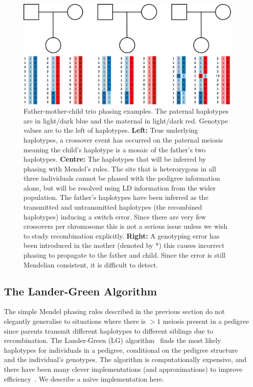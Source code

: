 \begin{figure}[h]
\vspace{20pt}
  \begin{center} 
    \includegraphics[width=\textwidth]{chap3figs/trio}
    \caption[Father-mother-child trio phasing examples]{Father-mother-child trio phasing examples.  The paternal haplotypes are in light/dark blue and the maternal in light/dark red.  Genotype values are to the left of haplotypes.  \textbf{Left:} True underlying haplotypes, a crossover event has occurred on the paternal meiosis meaning the child's haplotype is a mosaic of the father's two haplotypes. \textbf{Centre:} The haplotypes that will be inferred by phasing with Mendel's rules.  The site that is heterozygous in all three individuals cannot be phased with the pedigree information alone, but will be resolved using LD information from the wider population. The father's haplotypes have been inferred as the transmitted and untransmitted haplotypes (the recombined haplotypes) inducing a switch error.  Since there are very few crossovers per chromosome this is not a serious issue unless we wish to study recombination explicitly.  \textbf{Right:}  A genotyping error has been introduced in the mother (denoted by *) this causes incorrect phasing to propagate to the father and child.  Since the error is still Mendelian consistent, it is difficult to detect.\label{chap3:trio}}
  \end{center} 
\end{figure}
\clearpage
\subsection{The Lander-Green Algorithm}

The simple Mendel phasing rules described in the previous section do not elegantly generalise to situations where there is $>1$ meiosis present in a pedigree since parents transmit different haplotypes to different siblings due to recombination.  The Lander-Green (LG) algorithm~\citep{lander1987} finds the most likely haplotypes for individuals in a pedigree, conditional on the pedigree structure and the individual's genotypes.  The algorithm is computationally expensive, and there have been many clever implementations (and approximations) to improve efficiency~\citep{sobel1996descent,gudbjartsson2000allegro,abecasis2002merlin,lange2013mendel}. We describe a na\"{\i}ve implementation here. 


